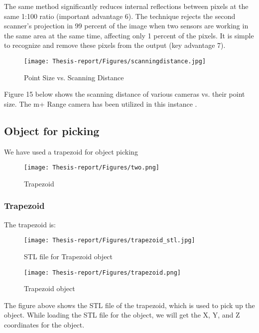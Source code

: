 \documentclass[12pt]{article}
\begin{document}
The same method significantly reduces internal reflections between pixels at the same 1:100 ratio (important advantage 6).  The technique rejects the second scanner's projection in 99 percent of the image when two sensors are working in the same area at the same time, affecting only 1 percent of the pixels. It is simple to recognize and remove these pixels from the output (key advantage 7)\cite{ref15}.
 
\begin{figure}[h]
    \centering
    \texttt{[image: Thesis-report/Figures/scanningdistance.jpg]}
    \caption{Point Size vs. Scanning Distance \cite{ref15}}
    \label{fig:scanning-distance}
\end{figure}

Figure 15 below shows the scanning distance of various cameras vs. their point size. The m+ Range camera has been utilized in this instance \cite{ref15}. 

\newpage
\subsection{Object for picking}
We have used a trapezoid for object picking 

\begin{figure}[h]
    \centering
    \texttt{[image: Thesis-report/Figures/two.png]} 
    \caption{Trapezoid}
    \label{fig1:two}
\end{figure}

\subsubsection{Trapezoid}
The trapezoid  is:\\
\begin{figure}
\centering
\begin{minipage}{0.58\textwidth} %
    \centering
    \texttt{[image: Thesis-report/Figures/trapezoid\_stl.jpg]} 
    \caption{STL file for Trapezoid object}
    \label{fig:trapezoid_stl}
\end{minipage}
\hfill
\begin{minipage}{0.28\textwidth} %
    \centering
    \texttt{[image: Thesis-report/Figures/trapezoid.png]} \caption{Trapezoid object}
    \label{fig:trapezoid}
\end{minipage}
\end{figure}
The figure above shows the STL file of the trapezoid, which is used to pick up the object. While loading the STL file for the object, we will get the X, Y, and Z coordinates for the object.
\end{document}
